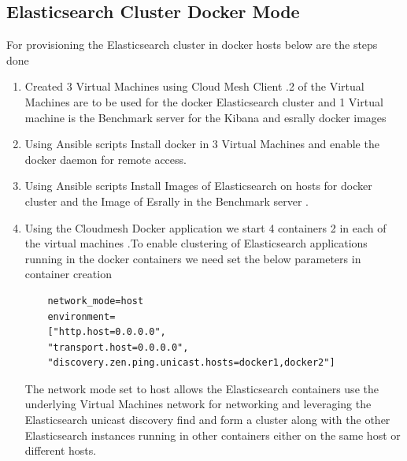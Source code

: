 \documentclass[9pt,twocolumn,twoside]{../../styles/osajnl}
\begin{document}
 
 \subsection{Elasticsearch Cluster Docker Mode}
  For provisioning the Elasticsearch cluster in docker hosts below are the steps done
\begin{enumerate}
\item Created 3 Virtual Machines using Cloud Mesh Client .2 of the Virtual Machines  are to be used for the docker Elasticsearch cluster and 1 Virtual machine is the Benchmark server for the Kibana and esrally docker images 
\item Using Ansible scripts Install docker in 3 Virtual Machines and enable the docker daemon for remote access.
\item Using Ansible scripts Install Images of Elasticsearch  on hosts for docker cluster and the Image of Esrally in the Benchmark server .
\item Using the Cloudmesh Docker application we start 4 containers 2 in each of the virtual machines .To enable clustering of Elasticsearch applications running in the docker containers we need set the below parameters in container creation
\begin{verbatim}
    network_mode=host 
    environment=
    ["http.host=0.0.0.0",
    "transport.host=0.0.0.0",
    "discovery.zen.ping.unicast.hosts=docker1,docker2"]
\end{verbatim}

The network mode set to host allows the Elasticsearch containers use the underlying Virtual Machines  network for networking and leveraging the Elasticsearch unicast discovery find and form a cluster along with the other Elasticsearch instances running in other
containers either on the same host or different hosts.

\end{enumerate}
\end{document}
